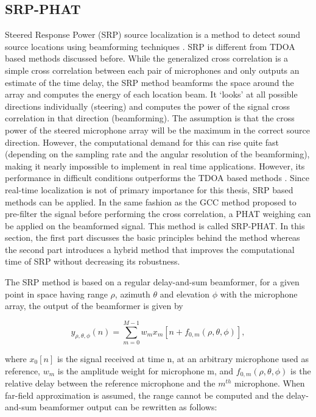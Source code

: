 \subsection{SRP-PHAT}

Steered Response Power (SRP) source localization is a method to detect sound source locations using beamforming techniques \cite{krim1996two}. SRP is different from TDOA based methods discussed before. While the generalized cross correlation is a simple cross correlation between each pair of microphones and only outputs an estimate of the time delay, the SRP method beamforms the space around the array and computes the energy of each location beam.  It `looks' at all possible directions individually (steering) and computes the power of the signal cross correlation in that direction (beamforming). The assumption is that the cross power of the steered microphone array will be the maximum in the correct source direction. However, the computational demand for this can rise quite fast (depending on the sampling rate and the angular resolution of the beamforming), making it nearly impossible to implement in real time applications. However, its performance in difficult conditions outperforms the TDOA based methods \cite{dmochowski2007generalized}. Since real-time localization is not of primary importance for this thesis, SRP based methods can be applied. In the same fashion as the GCC method proposed to pre-filter the signal before performing the cross correlation, a PHAT weighing can be applied on the beamformed signal. This method is called SRP-PHAT. In this section, the first part discusses the basic principles behind the method whereas the second part introduces a hybrid method that improves the computational time of SRP without decreasing its robustness. 


The SRP method is based on a regular delay-and-sum beamformer, for a given point in space having range $\rho$, azimuth $\theta$ and elevation $\phi$ with the microphone array, the output of the beamformer is given by

\begin{equation}
    y_{\rho,\theta,\phi}(n)=\sum\limits_{m=0}^{M-1}{w_m x_m[n + f_{0,m}(\rho,\theta,\phi)]},
\end{equation}

where $x_0[n]$ is the signal received at time n, at an arbitrary microphone used as reference, $w_m$ is the amplitude weight for microphone m, and $f_{0,m}(\rho,\theta,\phi)$ is the relative delay between the reference microphone and the $m^{th}$ microphone. When far-field approximation is assumed, the range cannot be computed and the delay-and-sum beamformer output can be rewritten as follows:

